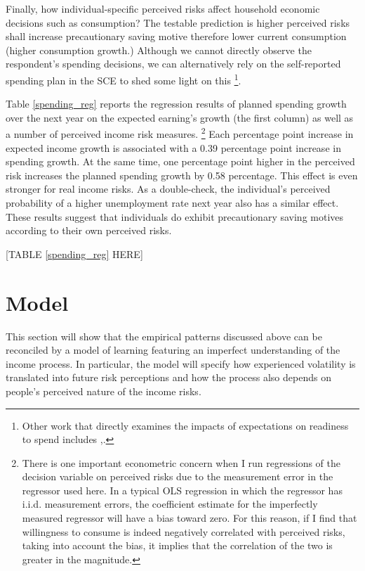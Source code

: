 \documentclass[12pt,notitlepage,onecolumn,aps,pra]{article}
\begin{document}
Finally, how individual-specific perceived risks affect household
economic decisions such as consumption? The testable prediction is
higher perceived risks shall increase precautionary saving motive
therefore lower current consumption (higher consumption growth.)
Although we cannot directly observe the respondent's spending decisions,
we can alternatively rely on the self-reported spending plan in the SCE
to shed some light on this
\footnote{Other work that directly examines the impacts of expectations on readiness to spend includes \cite{bachmann2015inflation},\cite{coibion2020forward}.}.

Table \ref{spending_reg} reports the regression results of planned
spending growth over the next year on the expected earning's growth (the
first column) as well as a number of perceived income risk measures.
\footnote{There is one important econometric concern when I run regressions of the decision variable on perceived risks due to the measurement error in the regressor used here. In a typical OLS regression in which the regressor has i.i.d. measurement errors, the coefficient estimate for the imperfectly measured regressor will have a bias toward zero. For this reason, if I find that willingness to consume is indeed negatively correlated with perceived risks, taking into account the bias, it implies that the correlation of the two is greater in the magnitude.}
Each percentage point increase in expected income growth is associated
with a 0.39 percentage point increase in spending growth. At the same
time, one percentage point higher in the perceived risk increases the
planned spending growth by 0.58 percentage. This effect is even stronger
for real income risks. As a double-check, the individual's perceived
probability of a higher unemployment rate next year also has a similar
effect. These results suggest that individuals do exhibit precautionary
saving motives according to their own perceived risks.

{[}TABLE \ref{spending_reg} HERE{]}



    \hypertarget{model}{%
\section{Model}\label{model}}

This section will show that the empirical patterns discussed above can
be reconciled by a model of learning featuring an imperfect
understanding of the income process. In particular, the model will
specify how experienced volatility is translated into future risk
perceptions and how the process also depends on people's perceived
nature of the income risks.
\end{document}
